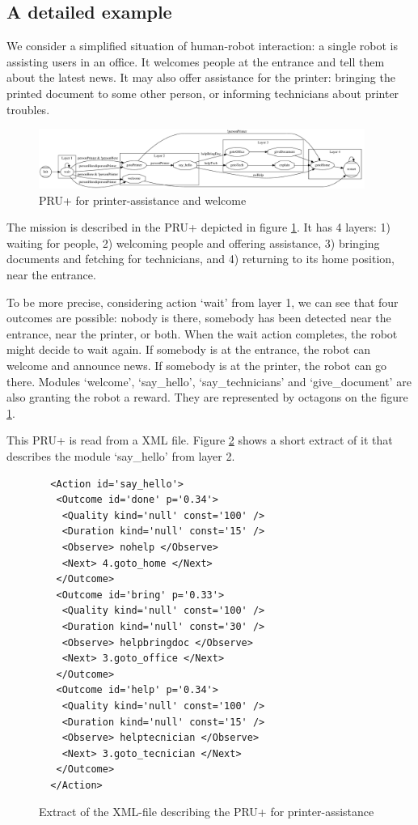 \subsection {A detailed example}

We consider a simplified situation of human-robot interaction: a single robot is assisting users in an office. It welcomes people at the entrance and tell them about the latest news. It may also offer assistance for the printer: bringing the printed document to some other person, or informing technicians about printer troubles.

\begin{figure}
\centering
\includegraphics[width=0.95\textwidth]{fig/PRU}
\caption{PRU+ for printer-assistance and welcome}
\label{fig:pru}
\end{figure}

The mission is described in the PRU+ depicted in figure \ref{fig:pru}. It has 4 layers: 1) waiting for people, 2) welcoming people and offering assistance, 3) bringing documents and fetching for technicians, and 4) returning to its home position, near the entrance.

To be more precise, considering action `wait' from layer 1, we can see that four outcomes are possible: nobody is there, somebody has been detected near the entrance, near the printer, or both. When the wait action completes, the robot might decide to wait again. If somebody is at the entrance, the robot can welcome and announce news. If somebody is at the printer, the robot can go there.
Modules `welcome', `say\_hello', `say\_technicians' and `give\_document' are also granting the robot a reward. They are represented by octagons on the figure  \ref{fig:pru}.

This PRU+ is read from a XML file. Figure \ref{fig:xml} shows a short extract of it that describes the module `say\_hello' from layer 2.

\begin{figure}
\centering
\begin{lstlisting}
  <Action id='say_hello'>
   <Outcome id='done' p='0.34'>
    <Quality kind='null' const='100' />
    <Duration kind='null' const='15' />
    <Observe> nohelp </Observe>
    <Next> 4.goto_home </Next>
   </Outcome>
   <Outcome id='bring' p='0.33'>
    <Quality kind='null' const='100' />
    <Duration kind='null' const='30' />
    <Observe> helpbringdoc </Observe>
    <Next> 3.goto_office </Next>
   </Outcome>
   <Outcome id='help' p='0.34'>
    <Quality kind='null' const='100' />
    <Duration kind='null' const='15' />
    <Observe> helptecnician </Observe>
    <Next> 3.goto_tecnician </Next>
   </Outcome>
  </Action>
\end{lstlisting}
\caption{Extract of the XML-file describing the PRU+ for printer-assistance}
\label{fig:xml}
\end{figure}

